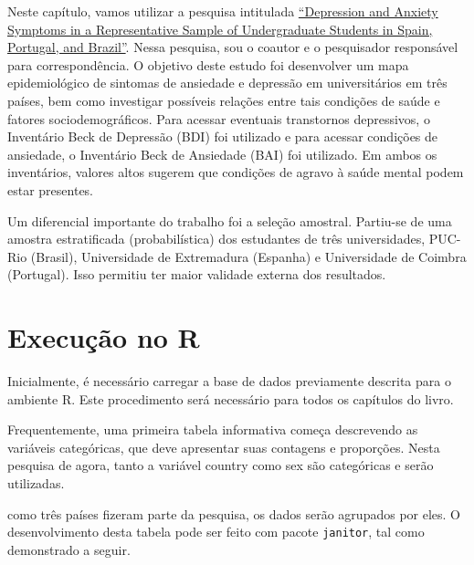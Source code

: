 \documentclass[
]{book}
\newenvironment{Shaded}{\begin{snugshade}}{\end{snugshade}}
\newcommand{\KeywordTok}[1]{\textcolor[rgb]{0.13,0.29,0.53}{\textbf{#1}}}
\newcommand{\NormalTok}[1]{#1}
\newcommand{\OperatorTok}[1]{\textcolor[rgb]{0.81,0.36,0.00}{\textbf{#1}}}
\newcommand{\StringTok}[1]{\textcolor[rgb]{0.31,0.60,0.02}{#1}}
\begin{document}
Neste capítulo, vamos utilizar a pesquisa intitulada \href{https://doi.org/10.1590/0102.3772e36412}{``Depression and Anxiety Symptoms in a Representative Sample of Undergraduate Students in Spain, Portugal, and Brazil''}. Nessa pesquisa, sou o coautor e o pesquisador responsável para correspondência. O objetivo deste estudo foi desenvolver um mapa epidemiológico de sintomas de ansiedade e depressão em universitários em três países, bem como investigar possíveis relações entre tais condições de saúde e fatores sociodemográficos. Para acessar eventuais transtornos depressivos, o Inventário Beck de Depressão (BDI) foi utilizado e para acessar condições de ansiedade, o Inventário Beck de Ansiedade (BAI) foi utilizado. Em ambos os inventários, valores altos sugerem que condições de agravo à saúde mental podem estar presentes.

Um diferencial importante do trabalho foi a seleção amostral. Partiu-se de uma amostra estratificada (probabilística) dos estudantes de três universidades, PUC-Rio (Brasil), Universidade de Extremadura (Espanha) e Universidade de Coimbra (Portugal). Isso permitiu ter maior validade externa dos resultados.

\hypertarget{execuuxe7uxe3o-no-r}{%
\section{Execução no R}\label{execuuxe7uxe3o-no-r}}

Inicialmente, é necessário carregar a base de dados previamente descrita para o ambiente R. Este procedimento será necessário para todos os capítulos do livro.

Frequentemente, uma primeira tabela informativa começa descrevendo as variáveis categóricas, que deve apresentar suas contagens e proporções. Nesta pesquisa de agora, tanto a variável country como sex são categóricas e serão utilizadas.

como três países fizeram parte da pesquisa, os dados serão agrupados por eles. O desenvolvimento desta tabela pode ser feito com pacote \texttt{janitor}, tal como demonstrado a seguir.

\begin{Shaded}
\end{Shaded}
\end{document}
